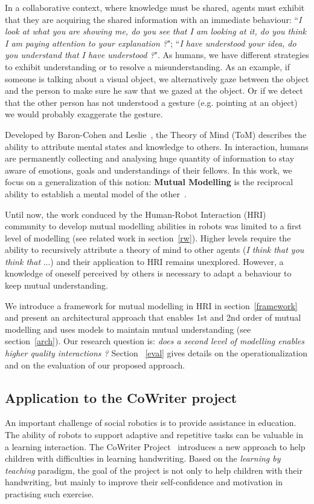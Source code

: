 \documentclass[10pt,a4paper]{article}
\begin{document}
In a collaborative context, where knowledge must be shared, agents must exhibit that they are acquiring the shared information with an immediate behaviour: ``\textit{I look at what you are showing me, do you see that I am looking at it, do you think I am paying attention to your explanation ?}"; ``\textit{I have understood your idea, do you understand that I have understood ?}". 
As humans, we have different strategies to exhibit understanding or to resolve a misunderstanding. 
As an example, if someone is talking about a visual object, we alternatively gaze between the object and the person to make sure he saw that we gazed at the object. Or if we detect that the other person has not understood a gesture (e.g. pointing at an object) we would probably exaggerate the gesture.

Developed by Baron-Cohen and Leslie~\cite{baron1985does}, the Theory of Mind (ToM) describes the ability to attribute mental states and knowledge to others. In interaction, humans are permanently collecting and analysing huge quantity of information to stay aware of emotions, goals and understandings of their fellows. In this work, we focus on a generalization of this notion: \textbf{Mutual Modelling} is the reciprocal ability to establish a mental model of the other~\cite{lemaignan2015mutual}. %

Until now, the work conduced by the Human-Robot Interaction (HRI) community to develop mutual modelling abilities in robots was limited to a first level of modelling (see related work in section~\ref{rw}). Higher levels require the ability to recursively attribute a theory of mind to other agents (\textit{I think that you think that} ...) and their application to HRI remains unexplored. However, a knowledge of oneself perceived by others is necessary to adapt a behaviour to keep mutual understanding. 

We introduce a framework for mutual modelling in HRI in section~\ref{framework} and present an  architectural approach that enables 1st and 2nd order of mutual modelling and uses models to maintain mutual understanding (see section~\ref{arch}).
Our research question is: \textit{does a second level of modelling enables higher quality interactions ?} 
Section ~\ref{eval} gives details on the operationalization and on the evaluation of our proposed approach.

\subsection{Application to the CoWriter project}
An important challenge of social robotics is to provide assistance in education. 
The ability of robots to support adaptive and repetitive tasks can be valuable in a learning interaction.
The CoWriter Project~\cite{Hood,jacq2016building} introduces a new approach to help children with difficulties in learning handwriting. 
Based on the \emph{learning by teaching} paradigm, the goal of the project is not only to help children with their handwriting, but mainly to improve their self-confidence and motivation in practising such exercise.
\end{document}
